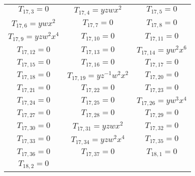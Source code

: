 \documentclass[12pt]{memoireuqam1.3}
\begin{document}
\begin{longtable}{|c|c|c|}
$T_{17,3}= 0$&

$T_{17,4}= yzwx^2$&

$T_{17,5}= 0$\\

$T_{17,6}= ywx^2$&

$T_{17,7}= 0$&

$T_{17,8}= 0$\\

$T_{17,9}= yzw^2x^4$&

$T_{17,10}= 0$&

$T_{17,11}= 0$\\

$T_{17,12}= 0$&

$T_{17,13}= 0$&

$T_{17,14}= yw^2x^6$\\

$T_{17,15}= 0$&

$T_{17,16}= 0$&

$T_{17,17}= 0$\\

$T_{17,18}= 0$&

$T_{17,19}= yz^{-1}w^2x^2$&

$T_{17,20}= 0$\\

$T_{17,21}= 0$&

$T_{17,22}= 0$&

$T_{17,23}= 0$\\

$T_{17,24}= 0$&

$T_{17,25}= 0$&

$T_{17,26}= yw^3x^4$\\

$T_{17,27}= 0$&

$T_{17,28}= 0$&

$T_{17,29}= 0$\\

$T_{17,30}= 0$&

$T_{17,31}= yzwx^2$&

$T_{17,32}= 0$\\

$T_{17,33}= 0$&

$T_{17,34}= yzw^2x^4$&

$T_{17,35}= 0$\\

$T_{17,36}= 0$&

$T_{17,37}= 0$&

$T_{18,1}= 0$\\

$T_{18,2}= 0$&


\end{longtable}
\end{document}
